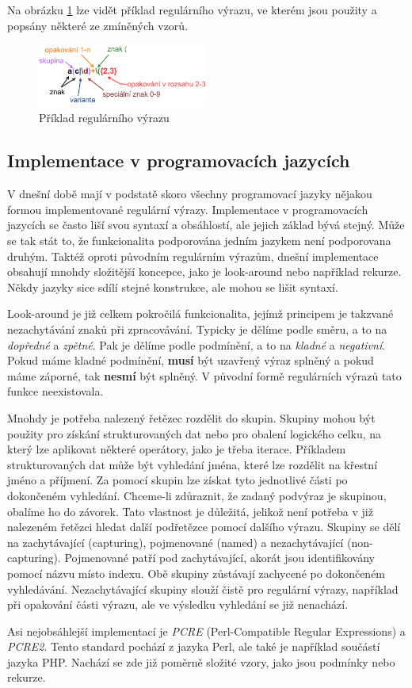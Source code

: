 Na obrázku \ref{fig:REGEXEXMP} lze vidět příklad regulárního výrazu, ve kterém jsou použity a popsány některé ze zmíněných vzorů.

\begin{figure}[!h]
	\centering
	\includegraphics[width=0.5\textwidth]{Figures/regex_exmp.pdf}
	\caption{Příklad regulárního výrazu}
	\label{fig:REGEXEXMP}
\end{figure}

\subsection*{Implementace v programovacích jazycích}\label{sec:impipl}

V dnešní době mají v podstatě skoro všechny programovací jazyky nějakou formou implementované regulární výrazy.
Implementace v programovacích jazycích se často liší svou syntaxí a obsáhlostí, ale jejich základ bývá stejný.
Může se tak stát to, že funkcionalita podporována jedním jazykem není podporovana druhým.
Taktéž oproti původním regulárním výrazům, dnešní implementace obsahují mnohdy složitější koncepce, jako je look-around nebo například rekurze.
Někdy jazyky sice sdílí stejné konstrukce, ale mohou se lišit syntaxí.

Look-around je již celkem pokročilá funkcionalita, jejímž principem je takzvané nezachytávání znaků při zpracovávání.
Typicky je dělíme podle směru, a to na \textit{dopředné} a \textit{zpětné}.
Pak je dělíme podle podmínění, a to na \textit{kladné} a \textit{negativní}.
Pokud máme kladné podmínění, \textbf{musí} být uzavřený výraz splněný a pokud máme záporné, tak \textbf{nesmí} být splněný.
V původní formě regulárních výrazů tato funkce neexistovala.

Mnohdy je potřeba nalezený řetězec rozdělit do skupin.
Skupiny mohou být použity pro získání strukturovaných dat nebo pro obalení logického celku, na který lze aplikovat některé operátory, jako je třeba iterace.
Příkladem strukturovaných dat může být vyhledání jména, které lze rozdělit na křestní jméno a příjmení.
Za pomocí skupin lze získat tyto jednotlivé části po dokončeném vyhledání. 
Chceme-li zdůraznit, že zadaný podvýraz je skupinou, obalíme ho do závorek.
Tato vlastnost je důležitá, jelikož není potřeba v již nalezeném řetězci hledat další podřetězce pomocí dalšího výrazu.
Skupiny se dělí na zachytávající (capturing), pojmenované (named) a nezachytávající (non-capturing).
Pojmenované patří pod zachytávající, akorát jsou identifikovány pomocí názvu místo indexu.
Obě skupiny zůstávají zachycené po dokončeném vyhledávání.
Nezachytávající skupiny slouží čistě pro regulární výrazy, například při opakování části výrazu, ale ve výsledku vyhledání se již nenachází.

Asi nejobsáhlejší implementací je \textit{PCRE} (Perl-Compatible Regular Expressions) a \textit{PCRE2}.
Tento standard pochází z jazyka Perl, ale také je například součástí jazyka PHP.
Nachází se zde již poměrně složité vzory, jako jsou podmínky nebo rekurze.

\endinput
